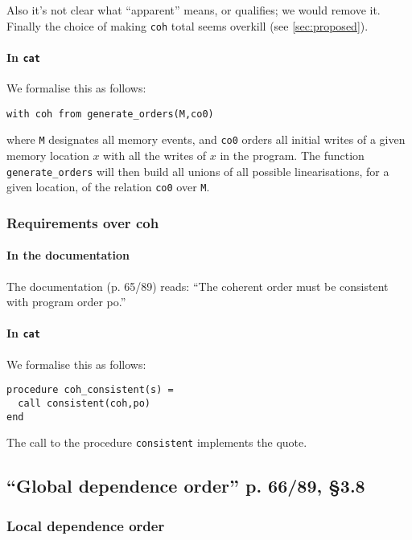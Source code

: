 \documentclass[a4paper]{article}
\begin{document}
Also it's not clear what ``apparent'' means, or qualifies; we would remove it.
Finally the choice of making {\tt coh} total seems overkill (see
\mysec\ref{sec:proposed}).

\paragraph{In {\tt cat}}
We formalise this as follows:
\begin{verbatim}
with coh from generate_orders(M,co0)
\end{verbatim}

where {\tt M} designates all memory events, and {\tt co0} orders all initial
writes of a given memory location $x$ with all the writes of $x$ in the
program. The function {\tt generate\_orders} will then build all unions of all
possible linearisations, for a given location, of the relation {\tt co0} over
{\tt M}. 

\subsubsection{Requirements over coh}

\paragraph{In the documentation} The documentation (p. 65/89) reads: ``The
coherent order must be consistent with program order po.''

\paragraph{In {\tt cat}}
We formalise this as follows: 
\begin{verbatim}
procedure coh_consistent(s) =
  call consistent(coh,po)
end 
\end{verbatim}

The call to the procedure {\tt consistent} implements the quote.

\subsection{``Global dependence order'' p. 66/89, \S 3.8}

\subsubsection{Local dependence order \label{sec:deps}}
\end{document}
